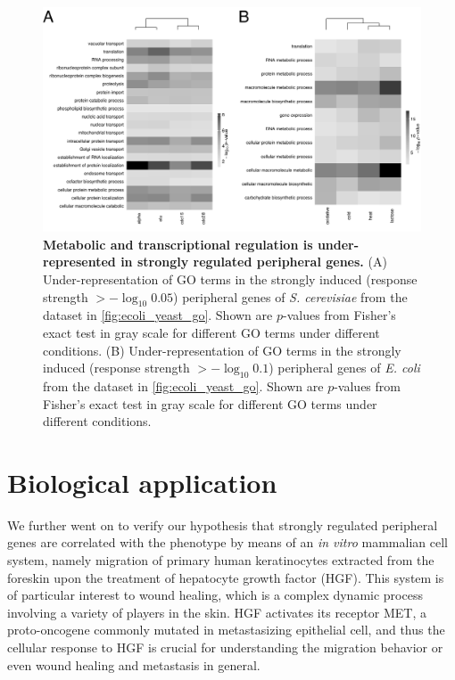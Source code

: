 \begin{figure}[!ht]
\begin{center}
\includegraphics[width=\textwidth]{yeast_ecoli_go_under.pdf}
\end{center}
\caption[GO term depletion of strongly regulated genes]{
{\bf Metabolic and transcriptional regulation is under-represented in 
strongly regulated peripheral genes.}
(A) Under-representation of GO
terms in the strongly induced (response strength $> -\log_{10}0.05$) 
peripheral genes of \emph{S. cerevisiae} from
the dataset in \ref{fig:ecoli_yeast_go}. Shown 
are $p$-values
from Fisher's exact test in gray scale for different GO terms under different 
conditions.
(B) Under-representation of GO terms
in the strongly induced (response strength $> -\log_{10}0.1$) peripheral genes 
of \emph{E. coli} from the dataset 
in \ref{fig:ecoli_yeast_go}. Shown are $p$-values
from Fisher's exact test in gray scale for different GO terms under different 
conditions. 
}
\label{fig:ecoli_yeast_go_under}
\end{figure}

\section{Biological application}
We further went on to verify our hypothesis that strongly regulated peripheral 
genes are correlated with the phenotype by means of an \emph{in vitro}
mammalian cell system, namely migration of primary human keratinocytes extracted from the foreskin
upon the treatment of hepatocyte growth factor (HGF). 
This system is of particular interest to wound healing, which is a complex 
dynamic process involving a variety of players in the skin.
HGF activates its receptor MET, a proto-oncogene commonly mutated in 
metastasizing epithelial cell, and thus the cellular response to HGF is 
crucial for understanding the migration behavior or even wound healing and 
metastasis in general. 

